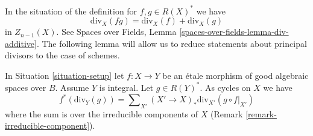 \noindent
In the situation of the definition for $f, g \in R(X)^*$ we have
$$
\text{div}_X(fg) = \text{div}_X(f) + \text{div}_X(g)
$$
in $Z_{n - 1}(X)$. See Spaces over Fields, Lemma
\ref{spaces-over-fields-lemma-div-additive}.
The following lemma will allow us to reduce
statements about principal divisors to the case of schemes.

\begin{lemma}
\label{lemma-etale-pullback-principal-divisor}
In Situation \ref{situation-setup} let $f : X \to Y$ be an \'etale
morphism of good algebraic spaces over $B$. Assume $Y$ is integral.
Let $g \in R(Y)^*$. As cycles on $X$ we have
$$
f^*(\text{div}_Y(g)) =
\sum\nolimits_{X'} (X' \to X)_*\text{div}_{X'}(g \circ f|_{X'})
$$
where the sum is over the irreducible components of $X$
(Remark \ref{remark-irreducible-component}).
\end{lemma}

